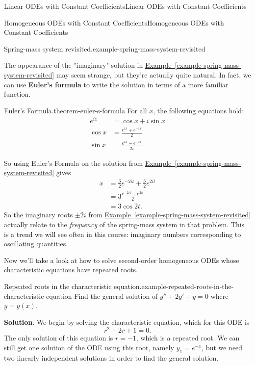 \documentclass[10pt,]{book}
\newcommand{\terminology}[1]{\textbf{#1}}
\numberwithin{equation}{section}
\newcommand{\amp}{&}
\begin{document}
\begin{chapterptx}{Linear ODEs with Constant Coefficients}{}{Linear ODEs with Constant Coefficients}{}{}
\begin{sectionptx}{Homogeneous ODEs with Constant Coefficients}{}{Homogeneous ODEs with Constant Coefficients}{}{}
\begin{example}{Spring-mass system revisited.}{example-spring-mass-system-revisited}
\begin{equation*}
\end{equation*}
%
\end{example}
\hypertarget{p-189}{}%
The appearance of the "imaginary" solution in \hyperref[example-spring-mass-system-revisited]{Example~\ref{example-spring-mass-system-revisited}} may seem strange, but they're actually quite natural. In fact, we can use \terminology{Euler's formula} to write the solution in terms of a more familiar function.%
\begin{theorem}{Euler's Formula.}{}{theorem-euler-s-formula}%
\hypertarget{p-190}{}%
For all \(x\), the following equations hold:%
\begin{align*}
e^{ix} \amp = \cos x + i\sin x \\
\cos x \amp = \frac{e^{ix}+e^{-ix}}{2} \\
\sin x \amp = \frac{e^{ix} - e^{-ix}}{2i} 
\end{align*}
%
\end{theorem}
\hypertarget{p-191}{}%
So using Euler's Formula on the solution from \hyperref[example-spring-mass-system-revisited]{Example~\ref{example-spring-mass-system-revisited}} gives%
\begin{align*}
x \amp = \frac{3}{2}e^{-2it} + \frac{3}{2} e^{2it} \\
\amp = 3\frac{e^{-2it} + e^{2it}}{2} \\
\amp = 3\cos2t. 
\end{align*}
So the imaginary roots \(\pm2i\) from \hyperref[example-spring-mass-system-revisited]{Example~\ref{example-spring-mass-system-revisited}} actually relate to the \emph{frequency} of the spring-mass system in that problem. This is a trend we will see often in this course: imaginary numbers corresponding to oscillating quantities.%
\par
\hypertarget{p-192}{}%
Now we'll take a look at how to solve second-order homogeneous ODEs whose characteristic equations have repeated roots.%
\begin{example}{Repeated roots in the characteristic equation.}{example-repeated-roots-in-the-characteristic-equation}%
\hypertarget{p-193}{}%
Find the general solution of \(y'' + 2y' + y = 0\) where \(y = y(x)\).%
\par\smallskip%
\noindent\textbf{Solution}.\hypertarget{solution-29}{}\quad%
\hypertarget{p-194}{}%
We begin by solving the characteristic equation, which for this ODE is%
\begin{equation*}
r^{2} + 2r + 1 = 0.
\end{equation*}
The only solution of this equation is \(r=-1\), which is a repeated root. We can still get one solution of the ODE using this root, namely \(y_{1} = e^{-x}\), but we need two linearly independent solutions in order to find the general solution.%

\end{example}
\end{sectionptx}
\end{chapterptx}
\end{document}
